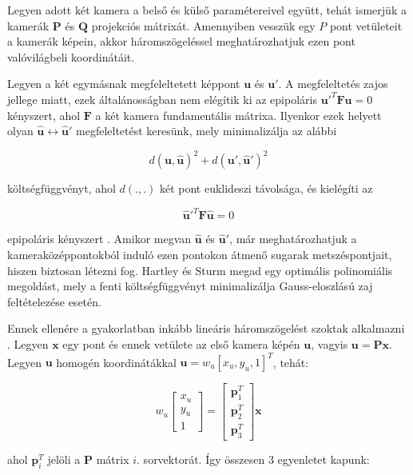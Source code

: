 Legyen adott két kamera a belső és külső paramétereivel együtt, tehát ismerjük a kamerák $\mathbf{P}$ és $\mathbf{Q}$ projekciós mátrixát. Amennyiben vesszük egy $P$ pont vetületeit a kamerák képein, akkor háromszögeléssel meghatározhatjuk ezen pont valóvilágbeli koordinátáit.

Legyen a két egymásnak megfeleltetett képpont $\mathbf{u}$ és $\mathbf{u}'$. A megfeleltetés zajos jellege miatt, ezek általánosságban nem elégítik ki az epipoláris $\mathbf{u}'^T \mathbf{F} \mathbf{u} = 0$ kényszert, ahol $\mathbf{F}$ a két kamera fundamentális mátrixa. Ilyenkor ezek helyett olyan $\mathbf{\hat{u}} \leftrightarrow \mathbf{\hat{u}}'$ megfeleltetést keresünk, mely minimalizálja az alábbi

\[d(\mathbf{u}, \mathbf{\hat{u}})^2 + d(\mathbf{u}', \mathbf{\hat{u}}')^2\]

költségfüggvényt, ahol $d(., .)$ két pont euklideszi távolsága, és kielégíti az

\[\mathbf{\hat{u}}'^T \mathbf{F} \mathbf{\hat{u}} = 0\]

epipoláris kényszert \cite{hartley-triangulation}. Amikor megvan $\mathbf{\hat{u}}$ és $\mathbf{\hat{u}}'$, már meghatározhatjuk a kameraközéppontokból induló ezen pontokon átmenő sugarak metszéspontjait, hiszen biztosan létezni fog. Hartley és Sturm \cite{hartley-triangulation} megad egy optimális polinomiális megoldást, mely a fenti költségfüggvényt minimalizálja Gauss-eloszlású zaj feltételezése esetén.

Ennek ellenére a gyakorlatban inkább lineáris háromszögelést szoktak alkalmazni \cite[5.1 szekció]{hartley-triangulation}. Legyen $\mathbf{x}$ egy pont és ennek vetülete az első kamera képén $\mathbf{u}$, vagyis $\mathbf{u} = \mathbf{P}\mathbf{x}$. Legyen $\mathbf{u}$ homogén koordinátákkal $\mathbf{u} = w_u[x_u, y_u, 1]^T$, tehát:

\[w_u\left[ \begin{array}{c} x_u \\ y_u \\ 1 \end{array} \right] = \left[ \begin{array}{c} \mathbf{p}_1^T \\ \mathbf{p}_2^T \\ \mathbf{p}_3^T \end{array} \right] \mathbf{x}\]

ahol $\mathbf{p}_i^T$ jelöli a $\mathbf{P}$ mátrix $i$. sorvektorát. Így összesen 3 egyenletet kapunk:

